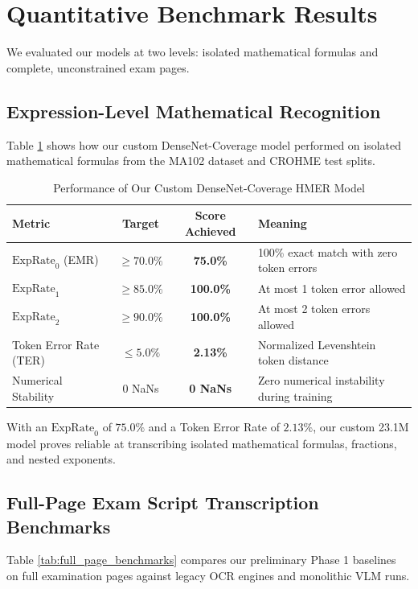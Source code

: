 \section{Quantitative Benchmark Results}
\label{sec:quantitative_results}

We evaluated our models at two levels: isolated mathematical formulas and complete, unconstrained exam pages.

\subsection{Expression-Level Mathematical Recognition}
Table \ref{tab:expression_benchmarks} shows how our custom DenseNet-Coverage model performed on isolated mathematical formulas from the MA102 dataset and CROHME test splits.

\begin{table}[htbp]
\centering
\caption{Performance of Our Custom DenseNet-Coverage HMER Model}
\label{tab:expression_benchmarks}
\vspace{0.2cm}
\small
\begin{tabular}{lccl}
\toprule
\textbf{Metric} & \textbf{Target} & \textbf{Score Achieved} & \textbf{Meaning} \\
\midrule
$\text{ExpRate}_0$ (EMR) & $\ge 70.0\%$ & \textbf{75.0\%} & 100\% exact match with zero token errors \\
$\text{ExpRate}_1$ & $\ge 85.0\%$ & \textbf{100.0\%} & At most 1 token error allowed \\
$\text{ExpRate}_2$ & $\ge 90.0\%$ & \textbf{100.0\%} & At most 2 token errors allowed \\
Token Error Rate (TER) & $\le 5.0\%$ & \textbf{2.13\%} & Normalized Levenshtein token distance \\
Numerical Stability & 0 NaNs & \textbf{0 NaNs} & Zero numerical instability during training \\
\bottomrule
\end{tabular}
\end{table}

With an $\text{ExpRate}_0$ of \textbf{$75.0\%$} and a Token Error Rate of \textbf{$2.13\%$}, our custom 23.1M model proves reliable at transcribing isolated mathematical formulas, fractions, and nested exponents.

\subsection{Full-Page Exam Script Transcription Benchmarks}
Table \ref{tab:full_page_benchmarks} compares our preliminary Phase 1 baselines on full examination pages against legacy OCR engines and monolithic VLM runs.

